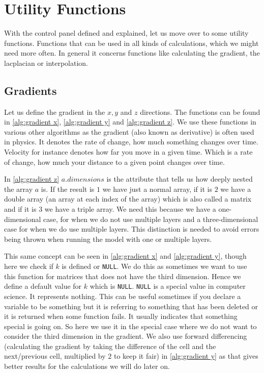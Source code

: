 \section{Utility Functions}
With the control panel defined and explained, let us move over to some utility functions. Functions that can be used in all kinds of calculations, which we might need more often. In general it 
concerns functions like calculating the gradient, the lacplacian or interpolation. 

\subsection{Gradients}
Let us define the gradient in the $x, y$ and $z$ directions. The functions can be found in \autoref{alg:gradient x}, \autoref{alg:gradient y} and \autoref{alg:gradient z}. We use these functions 
in various other algorithms as the gradient (also known as derivative) is often used in physics. It denotes the rate of change, how much something changes over time. Velocity for instance denotes
how far you move in a given time. Which is a rate of change, how much your distance to a given point changes over time. 

In \autoref{alg:gradient z} $a.dimensions$ is the attribute that tells us how deeply nested the array $a$ is. If the result is $1$ we have just a normal array, if it is $2$ we have a double array 
(an array at each index of the array) which is also called a matrix and if it is $3$ we have a triple array. We need this because we have a one-dimensional case, for when we do not use multiple 
layers and a three-dimensional case for when we do use multiple layers. This distinction is needed to avoid errors being thrown when running the model with one or multiple layers. 

This same concept can be seen in \autoref{alg:gradient x} and \autoref{alg:gradient y}, though here we check if $k$ is defined or \texttt{NULL}. We do this as sometimes we want to use this 
function for matrices that does not have the third dimension. Hence we define a default value for $k$ which is \texttt{NULL}. \texttt{NULL} is a special value in computer science. It represents 
nothing. This can be useful sometimes if you declare a variable to be something but it is referring to something that has been deleted or it is returned when some function fails. It usually 
indicates that something special is going on. So here we use it in the special case where we do not want to consider the third dimension in the gradient. We also use forward differencing 
(calculating the gradient by taking the difference of the cell and the next/previous cell, multiplied by $2$ to keep it fair) in \autoref{alg:gradient y} as that gives better results for the 
calculations we will do later on.


